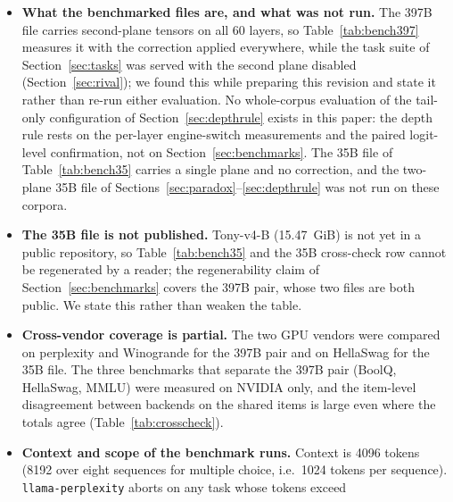\documentclass[10pt]{article} %
\begin{document}
\begin{itemize}
  a diff against the upstream merge commit of the TQ1\_0 Vulkan path, each
  with its SHA-256; one project-name string in comments and in three
  debugging environment-variable names was replaced for anonymity, and the
  replacement is declared there. The
  kernels were written for AMD RDNA; on the NVIDIA GPUs of
  Section~\ref{sec:benchmarks} they run correctly
  (Table~\ref{tab:crosscheck}) --- with one declared paired perplexity offset
  of $0.96\%$ on the two-plane file (Section~\ref{sec:crosscheck}) ---
  but are not optimised (about 0.6~s per HellaSwag task on the 397B), and there
  is no CUDA path for TQ1\_0.
\item \textbf{What the benchmarked files are, and what was not run.} The
  397B file carries second-plane tensors on all 60 layers, so
  Table~\ref{tab:bench397} measures it with the correction applied everywhere,
  while the task suite of Section~\ref{sec:tasks} was served with the second
  plane disabled (Section~\ref{sec:rival}); we found this while preparing this
  revision and state it rather than re-run either evaluation. No whole-corpus
  evaluation of the tail-only configuration of Section~\ref{sec:depthrule}
  exists in this paper: the depth rule rests on the per-layer engine-switch
  measurements and the paired logit-level confirmation, not on
  Section~\ref{sec:benchmarks}. The 35B file of Table~\ref{tab:bench35}
  carries a single plane and no correction, and the two-plane 35B file of
  Sections~\ref{sec:paradox}--\ref{sec:depthrule} was not run on these corpora.
\item \textbf{The 35B file is not published.} Tony-v4-B (15.47~GiB) is not yet
  in a public repository, so Table~\ref{tab:bench35} and the 35B cross-check
  row cannot be regenerated by a reader; the regenerability claim of
  Section~\ref{sec:benchmarks} covers the 397B pair, whose two files are both
  public. We state this rather than weaken the table.
\item \textbf{Cross-vendor coverage is partial.} The two GPU vendors were
  compared on perplexity and Winogrande for the 397B pair and on HellaSwag for
  the 35B file. The three benchmarks that separate the 397B pair (BoolQ,
  HellaSwag, MMLU) were measured on NVIDIA only, and the item-level
  disagreement between backends on the shared items is large even where the
  totals agree (Table~\ref{tab:crosscheck}).
\item \textbf{Context and scope of the benchmark runs.} Context is 4096 tokens
  (8192 over eight sequences for multiple choice, i.e.\ 1024 tokens per
  sequence). \texttt{llama-perplexity} aborts on any task whose tokens exceed

\end{itemize}
\end{document}
